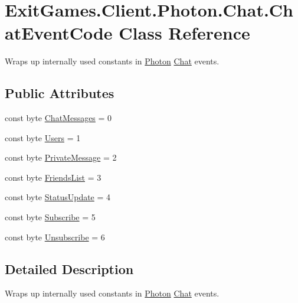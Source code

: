 \hypertarget{class_exit_games_1_1_client_1_1_photon_1_1_chat_1_1_chat_event_code}{}\section{Exit\+Games.\+Client.\+Photon.\+Chat.\+Chat\+Event\+Code Class Reference}
\label{class_exit_games_1_1_client_1_1_photon_1_1_chat_1_1_chat_event_code}


Wraps up internally used constants in \hyperlink{namespace_exit_games_1_1_client_1_1_photon}{Photon} \hyperlink{namespace_exit_games_1_1_client_1_1_photon_1_1_chat}{Chat} events.  


\subsection*{Public Attributes}
\begin{DoxyCompactItemize}
\item 
const byte \hyperlink{class_exit_games_1_1_client_1_1_photon_1_1_chat_1_1_chat_event_code_ab7e29d342c622f6c6831c7c20638871e}{Chat\+Messages} = 0
\item 
const byte \hyperlink{class_exit_games_1_1_client_1_1_photon_1_1_chat_1_1_chat_event_code_a8aac3f985184cfbe4e228510d8f94c86}{Users} = 1
\item 
const byte \hyperlink{class_exit_games_1_1_client_1_1_photon_1_1_chat_1_1_chat_event_code_a87ce4bd7e75af0c0dff70221ba197dcc}{Private\+Message} = 2
\item 
const byte \hyperlink{class_exit_games_1_1_client_1_1_photon_1_1_chat_1_1_chat_event_code_a3d73aefea41f86d82c9c4895e595250a}{Friends\+List} = 3
\item 
const byte \hyperlink{class_exit_games_1_1_client_1_1_photon_1_1_chat_1_1_chat_event_code_a3b479b981bb71508f954d8dcf7390552}{Status\+Update} = 4
\item 
const byte \hyperlink{class_exit_games_1_1_client_1_1_photon_1_1_chat_1_1_chat_event_code_ad5cb96a758e791541abac48e347f7517}{Subscribe} = 5
\item 
const byte \hyperlink{class_exit_games_1_1_client_1_1_photon_1_1_chat_1_1_chat_event_code_a9746eb3bc69c51490ee9834efa47c74f}{Unsubscribe} = 6
\end{DoxyCompactItemize}


\subsection{Detailed Description}
Wraps up internally used constants in \hyperlink{namespace_exit_games_1_1_client_1_1_photon}{Photon} \hyperlink{namespace_exit_games_1_1_client_1_1_photon_1_1_chat}{Chat} events. 

